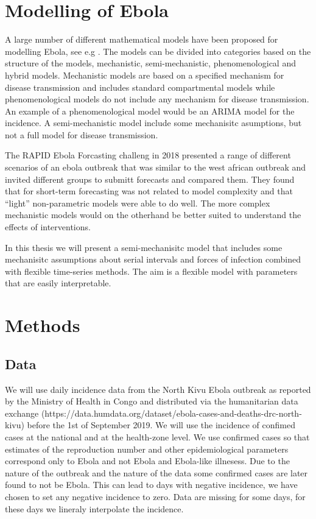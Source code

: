 \documentclass[12pt]{article}
\begin{document}
\section{Modelling of Ebola}

A large number of different mathematical models have been proposed for modelling Ebola, see e.g \cite{chretienMathematicalModelingWest,viboudRAPIDDEbolaForecasting2018}. The models can be divided into categories based on the structure of the models, mechanistic, semi-mechanistic, phenomenological and hybrid models. Mechanistic models are based on a specified mechanism for disease transmission and includes standard compartmental models while phenomenological models do not include any mechanism for disease transmission. An example of a phenomenological model would be an ARIMA model for the incidence. A semi-mechanistic model include some mechanisitc asumptions, but not a full model for disease transmission.

The RAPID Ebola Forcasting challeng in 2018 \cite{viboudRAPIDDEbolaForecasting2018} presented a range of different scenarios of an ebola outbreak that was similar to the west african outbreak and invited different groups to submitt forecasts and compared them. They found that for short-term forecasting was not related to model complexity and that ``light'' non-parametric models were able to do well. The more complex mechanistic models would on the otherhand be better suited to understand the effects of interventions. 

In this thesis we will present a semi-mechanisitc model that includes some mechanisitc assumptions about serial intervals and forces of infection combined with flexible time-series methods. The aim is a flexible model with parameters that are easily interpretable. 

\section{Methods}

\subsection{Data}
We will use daily incidence data from the North Kivu Ebola outbreak as reported by the Ministry of Health in Congo and distributed via the humanitarian data exchange (https://data.humdata.org/dataset/ebola-cases-and-deaths-drc-north-kivu) before the 1st of September 2019. We will use the incidence of confimed cases at the national and at the health-zone level. We use confirmed cases so that estimates of the reproduction number and other epidemiological parameters correspond only to Ebola and not Ebola and Ebola-like illnesess. Due to the nature of the outbreak and the nature of the data some confirmed cases are later found to not be Ebola. This can lead to days with negative incidence, we have chosen to set any negative incidence to zero. Data are missing for some days, for these days we lineraly interpolate the incidence. 
\end{document}
